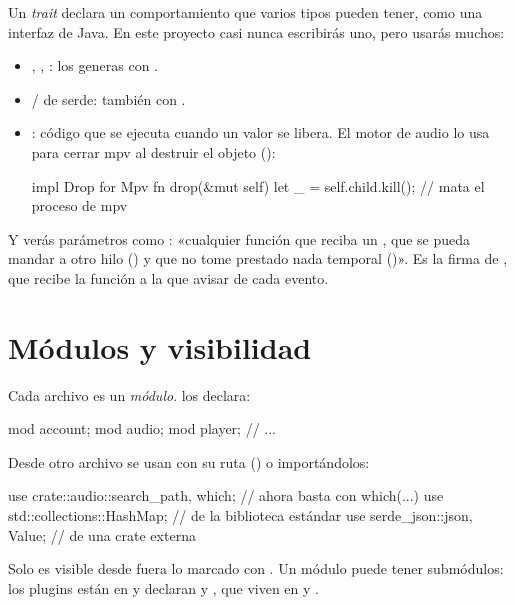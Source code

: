 Un \emph{trait} declara un comportamiento que varios tipos pueden tener, como una interfaz de
Java. En este proyecto casi nunca escribirás uno, pero usarás muchos:

\begin{itemize}
  \item {}, , : los generas con \cod{#[derive]}.
  \item {}/ de serde: también con \cod{#[derive]}.
  \item {}: código que se ejecuta cuando un valor se libera. El motor de audio lo usa
  para cerrar mpv al destruir el objeto ():
\begin{rust}
impl Drop for Mpv {
    fn drop(&mut self) {
        let _ = self.child.kill();      // mata el proceso de mpv
    }
}
\end{rust}
\end{itemize}

Y verás parámetros como : «cualquier función que reciba
un , que se pueda mandar a otro hilo () y que no tome prestado nada
temporal ()». Es la firma de , que recibe la función a la que
avisar de cada evento.

\section{Módulos y visibilidad}

Cada archivo  es un \emph{módulo}.  los declara:

\begin{rust}
mod account;
mod audio;
mod player;
// ...
\end{rust}

Desde otro archivo se usan con su ruta () o importándolos:

\begin{rust}
use crate::audio::{search_path, which};       // ahora basta con which(...)
use std::collections::HashMap;                 // de la biblioteca estándar
use serde_json::{json, Value};                 // de una crate externa
\end{rust}

Solo es visible desde fuera lo marcado con . Un módulo puede tener submódulos: los
plugins están en  y declaran  y , que
viven en  y .

